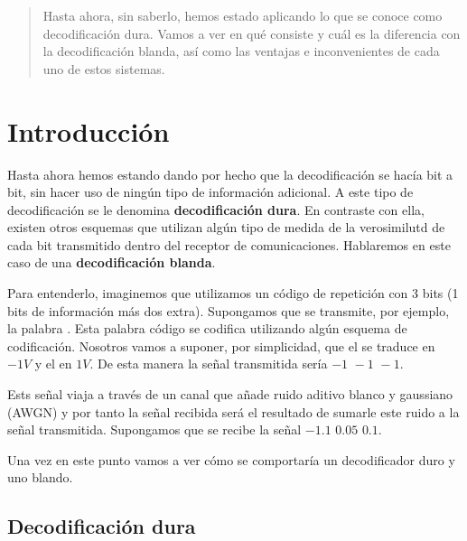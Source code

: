 \documentclass[es,practica,12pt]{uah}
\begin{document}

\maketitle

\begin{abstract}
	Hasta ahora, sin saberlo, hemos estado aplicando lo que se conoce como decodificación dura. Vamos a ver en qué consiste y cuál es la diferencia con la decodificación blanda, así como las ventajas e inconvenientes de cada uno de estos sistemas.
\end{abstract}

\section{Introducción}

Hasta ahora hemos estando dando por hecho que la decodificación se hacía bit a bit, sin hacer uso de ningún tipo de información adicional. A este tipo de decodificación se le denomina {\bf decodificación dura}. En contraste con ella, existen otros esquemas que utilizan algún tipo de medida de la verosimilutd de cada bit transmitido dentro del receptor de comunicaciones. Hablaremos en este caso de una {\bf decodificación blanda}. 

Para entenderlo, imaginemos que utilizamos un código de repetición con 3 bits (1 bits de información más dos extra). Supongamos que se transmite, por ejemplo, la palabra . Esta palabra código se codifica utilizando algún esquema de codificación. Nosotros vamos a suponer, por simplicidad, que el  se traduce en $-1V$ y el  en $1V$. De esta manera la señal transmitida sería $-1 \, \, -1 \, \, -1$. 

Ests señal viaja a través de un canal que añade ruido aditivo blanco y gaussiano (AWGN) y por tanto la señal recibida será el resultado de sumarle este ruido a la señal transmitida. Supongamos que se recibe la señal $-1.1 \, \, 0.05 \, \, 0.1$. 

Una vez en este punto vamos a ver cómo se comportaría un decodificador duro y uno blando.

\subsection{Decodificación dura}
\end{document}
